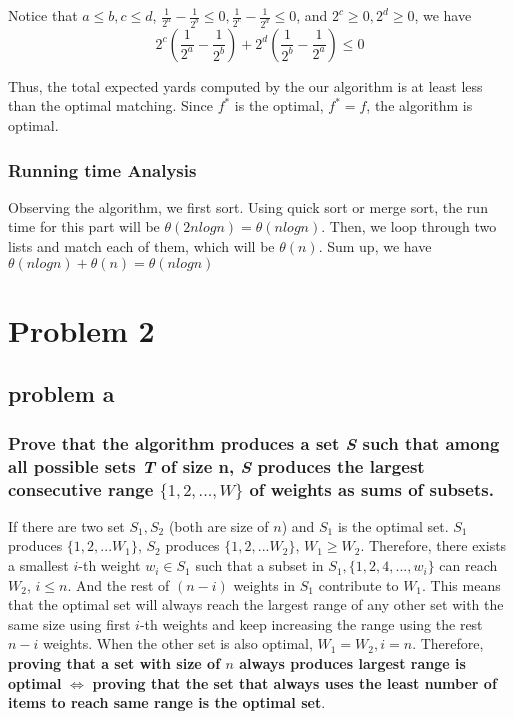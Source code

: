 \documentclass{article}
\begin{document}
        Notice that $a\leq b, c\leq d$, $\frac{1}{2^a}-\frac{1}{2^b} \leq 0, \frac{1}{2^c}-\frac{1}{2^d} \leq 0$, and $2^c \geq 0, 2^d\geq 0$, we have
        \[2^c(\frac{1}{2^a}-\frac{1}{2^b})+2^d(\frac{1}{2^b}-\frac{1}{2^a}) \leq 0\]

        Thus, the total expected yards computed by the our algorithm is at least less than the optimal matching. Since $f^*$ is the optimal, $f^* = f$, the algorithm is optimal.
        \\
        \subsubsection{Running time Analysis} 
        Observing the algorithm, we first sort. Using quick sort or merge sort, the run time for this part will be $\theta(2nlogn) = \theta(nlogn)$. Then, we loop through two lists and match each of them, which will be $\theta(n)$. Sum up, we have $\theta(nlogn)+\theta(n) = \theta(nlogn)$

\section{Problem 2}
    \subsection{problem a}
        \subsubsection{Prove that the algorithm produces a set \textit{S} such that among all possible sets \textit{T} of size n, \textit{S} produces the largest consecutive range $\{1, 2, . . . , W\}$ of weights as sums of subsets.}

        If there are two set $S_1, S_2$ (both are size of $n$) and $S_1$ is the optimal set. $S_1$ produces $\{1,2,...W_1\}$, $S_2$ produces $\{1,2,...W_2\}$, $W_1\geq W_2$. Therefore, there exists a smallest $i$-th weight $w_i \in S_1$ such that a subset in $S_1, \{1,2,4,...,w_i\}$ can reach $W_2$, $i\leq n$. And the rest of $(n-i)$ weights in $S_1$ contribute to $W_1$. This means that the optimal set will always reach the largest range of any other set with the same size using first $i$-th weights and keep increasing the range using the rest $n-i$ weights. When the other set is also optimal, $W_1=W_2, i = n$. Therefore, \textbf{proving that a set with size of $n$ always produces largest range is optimal} $\Leftrightarrow$ \textbf{proving that the set that always uses the least number of items to reach same range is the optimal set}.
        
\end{document}
